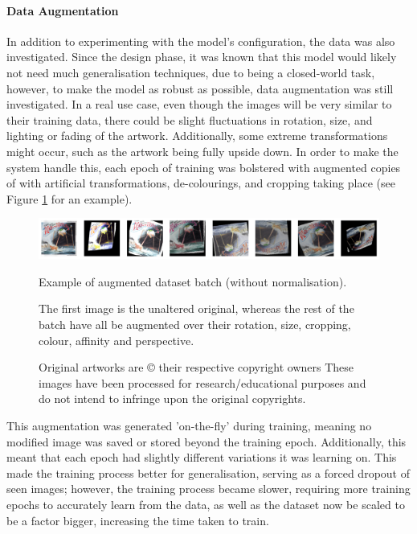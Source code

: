                     \paragraph{Data Augmentation}
        
                        In addition to experimenting with the model's configuration, the data was also investigated. Since the design phase, it was known that this model would likely not need much generalisation techniques, due to being a closed-world task, however, to make the model as robust as possible, data augmentation was still investigated. In a real use case, even though the images will be very similar to their training data, there could be slight fluctuations in rotation, size, and lighting or fading of the artwork. Additionally, some extreme transformations might occur, such as the artwork being fully upside down. In order to make the system handle this, each epoch of training was bolstered with augmented copies of with artificial transformations, de-colourings, and cropping taking place (see Figure \ref{fig:augmentedArts} for an example).
    
                        \begin{figure}[h]
                            \centering
                            \includegraphics[width=\textwidth]{images/AugmentedArts.png}
                            \caption{Example of augmented dataset batch (without normalisation).}
                            \label{fig:augmentedArts}
                            \caption*{
                                The first image is the unaltered original, whereas the rest of the batch have all be augmented over their rotation, size, cropping, colour, affinity and perspective.
                            }
                            \caption*{
                                Original artworks are © their respective copyright owners
                                \footnotesize These images have been processed for research/educational purposes and do not intend to infringe upon the original copyrights.
                            }
                        \end{figure}
    
                        This augmentation was generated 'on-the-fly' during training, meaning no modified image was saved or stored beyond the training epoch. Additionally, this meant that each epoch had slightly different variations it was learning on. This made the training process better for generalisation, serving as a forced dropout of seen images; however, the training process became slower, requiring more training epochs to accurately learn from the data, as well as the dataset now be scaled to be a factor bigger, increasing the time taken to train.
    
